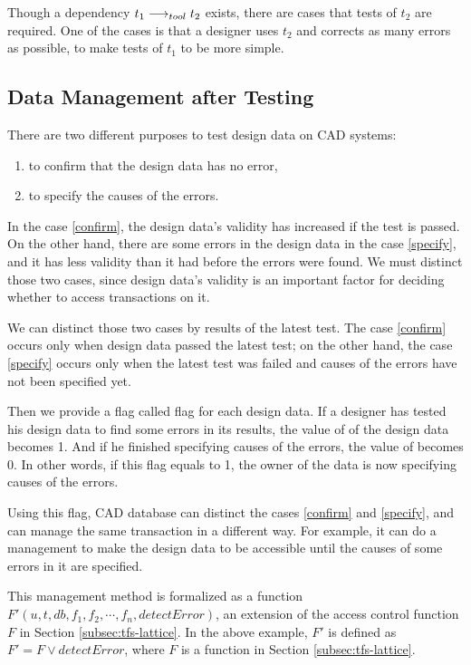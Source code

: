 Though a \testtool dependency $t_1 \longrightarrow_{tool} t_2$ exists, there are
cases that tests of $t_2$ are required.
One of the cases is that a designer uses $t_2$ and corrects as many
errors as possible, to make tests of $t_1$ to be more simple.

\subsection{Data Management after Testing}
 \label{subsec:aftertest}
There are two different purposes to test design data on CAD systems:
\begin{enumerate}
\item{\label{confirm}} to confirm that the design data has no error,
\item{\label{specify}} to specify the causes of the errors.
\end{enumerate}
In the case \ref{confirm}, the design data's validity has 
increased if the test is passed.
On the other hand, there are some errors in the design data in the
case \ref{specify}, and it has less validity than it had before
the errors were found.
We must distinct those two cases, since design data's validity is 
an important factor for deciding whether to access transactions on it.

We can distinct those two cases by results of the latest test.
The case \ref{confirm} occurs only when design data passed the latest 
test; on the other hand, the case \ref{specify} occurs only when the
latest test was failed and causes of the errors have not been specified yet.

Then we provide a flag called \deterr flag for each design data. 
If a designer has tested his design data to find some errors in its
results, the value of \deterr of the design data becomes
1.
And if he finished specifying causes of the errors, the value of 
\deterr becomes 0.
In other words, if this flag equals to 1, the owner of the data is now 
specifying causes of the errors.

Using this flag, CAD database can distinct the cases \ref{confirm} and
\ref{specify}, and can manage the same transaction in a different way.
For example, it can do a management to make the design data to be 
accessible until the causes of some errors in it are specified.

This management method is formalized as a function\\ $F'(u, t,
db, f_1,
f_2, \cdots, f_n, detectError)$, an extension of the access control
function $F$ in Section
\ref{subsec:tfs-lattice}.
In the above example, $F'$ is defined as $F' = F \vee detectError$, 
where $F$ is a function in Section \ref{subsec:tfs-lattice}.

